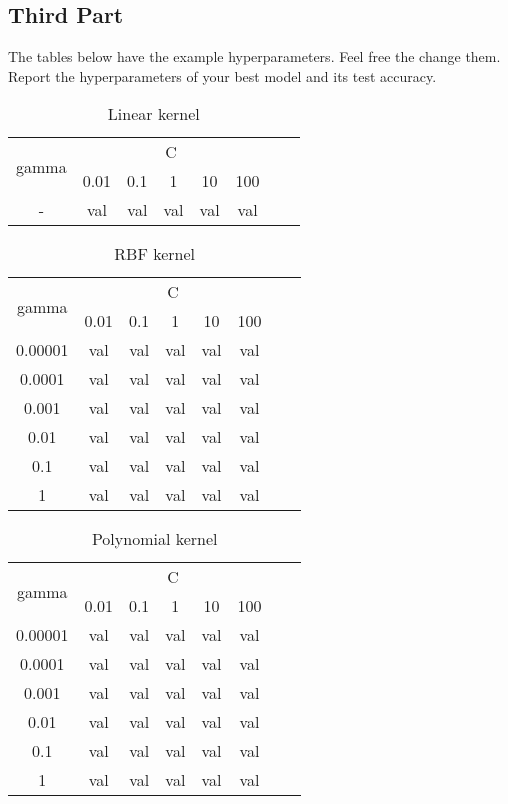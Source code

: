 \documentclass{article}
\begin{document}
\subsection{Third Part}
The tables below have the example hyperparameters. Feel free the change them. Report the hyperparameters of your best model and its test accuracy.
\begin{table}[h]
    \centering
    \begin{tabular}{|c|c|c|c|c|c|c|c|}
    \hline
    \multirow{2}{5em}{gamma} & \multicolumn{5}{c|}{C} \\
        & 0.01 & 0.1 & 1 & 10 & 100 \\
        \hline \hline
        -  & val & val & val & val & val \\
        \hline
    \end{tabular}
    \caption{Linear kernel}
    \label{tab:linear}
\end{table}

\begin{table}[h]
    \centering
    \begin{tabular}{|c|c|c|c|c|c|c|c|}
    \hline
    \multirow{2}{5em}{gamma} & \multicolumn{5}{c|}{C} \\
        & 0.01 & 0.1 & 1 & 10 & 100 \\
        \hline \hline
        0.00001  & val & val & val & val & val \\
        0.0001  & val & val & val & val & val \\
        0.001  & val & val & val & val & val \\
        0.01  & val & val & val & val & val \\
        0.1  & val & val & val & val & val \\
        1  & val & val & val & val & val \\
        \hline
    \end{tabular}
    \caption{RBF kernel}
    \label{tab:rbf}
\end{table}

\begin{table}[h]
    \centering
    \begin{tabular}{|c|c|c|c|c|c|c|c|}
    \hline
    \multirow{2}{5em}{gamma} & \multicolumn{5}{c|}{C} \\
        & 0.01 & 0.1 & 1 & 10 & 100 \\
        \hline \hline
        0.00001  & val & val & val & val & val \\
        0.0001  & val & val & val & val & val \\
        0.001  & val & val & val & val & val \\
        0.01  & val & val & val & val & val \\
        0.1  & val & val & val & val & val \\
        1  & val & val & val & val & val \\
        \hline
    \end{tabular}
    \caption{Polynomial kernel}
    \label{tab:poly}
\end{table}
\end{document}
